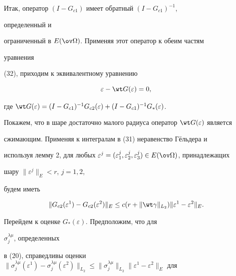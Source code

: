  


 


Итак, оператор $(I-G_{c1})$ имеет обратный $(I-G_{c1})^{-1}$, 


определенный и 


ограниченный в $E(\ov\Omega)$. Применяя этот оператор к обеим частям 


уравнения 


(32), приходим к эквивалентному уравнению 


\begin{equation} 


\varepsilon-\wt G(\varepsilon)=0, 


\end{equation} 


где $\wt G(\varepsilon)=(I-G_{c1})^{-1} G_{c2}(\varepsilon)+ 


(I-G_{c1})^{-1}G_*(\varepsilon)$. 


 


Покажем, что в шаре достаточно малого радиуса оператор $\wt 


G(\varepsilon)$ является 


сжимающим. Применяя к интегралам в (31) неравенство Г\"ельдера и 


используя лемму 2, для любых $\varepsilon^j=(\varepsilon^j_1, 


\varepsilon^j_2, \varepsilon^j_3)\in E(\ov\Omega)$, принадлежащих 


шару $\|\varepsilon^j\|_E<r$, $j=1,2$, 


будем иметь 


\begin{equation} 


\|G_{c2}(\varepsilon^1)-G_{c2}(\varepsilon^2)\|_E\le 


c(r+\|\wt\gamma\|_{L_2})\|\varepsilon^1-\varepsilon^2\|_E. 


\end{equation} 


 


Перейдем к оценке $G_*(\varepsilon)$. Предположим, что для 


$\sigma^{\lambda\mu}_j$, определенных 


в (20), справедливы оценки $\|\sigma^{\lambda\mu}_j (\varepsilon^1)- 


\sigma^{\lambda\mu}_j (\varepsilon^2)\|_{L_2}\le 


\|\sigma^{\lambda\mu}_j\|_{L_2} \|\varepsilon^1-\varepsilon^2\|_E$ для 


